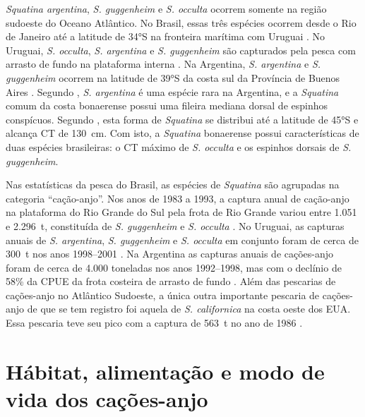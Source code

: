 \documentclass[a4paper,11pt,twoside,showtrims,onecolumn,openright,final]{memoir}
\begin{document}
\emph{Squatina argentina}, \emph{S. guggenheim} e \emph{S. occulta} ocorrem somente na região sudoeste do Oceano Atlântico. 
No Brasil, essas três espécies ocorrem desde o Rio de Janeiro até a latitude de 34°S na fronteira 
marítima com Uruguai \citep{soto2001a}. %
No Uruguai, \emph{S. occulta}, \emph{S. argentina} e \emph{S. guggenheim} são capturados 
pela pesca com arrasto de fundo na plataforma interna \citep{meneses2003,paesch2003}. %
Na Argentina, \emph{S. argentina} e \emph{S. guggenheim} ocorrem na latitude de 39°S 
da costa sul da Província de Buenos Aires \citep{marini1930,marini1936}. %
Segundo \citet{menni1984}, %
\emph{S. argentina} é uma espécie rara na Argentina, e a 
\emph{Squatina} comum da costa bonaerense possui uma fileira mediana dorsal de espinhos conspícuos. 
Segundo \citet{cousseau2000}, %
esta forma de \emph{Squatina} se distribui até a latitude 
de 45°S e alcança CT de 130~cm. Com isto, a \emph{Squatina} bonaerense possui características de duas 
espécies brasileiras: o CT máximo de \emph{S. occulta} e os espinhos dorsais de \emph{S. guggenheim}. 

Nas estatísticas da pesca do Brasil, as espécies de \emph{Squatina} são agrupadas na categoria ``cação-anjo''.  
Nos anos de 1983 a 1993, a captura anual de cação-anjo na plataforma do Rio Grande do Sul pela frota 
de Rio Grande variou entre 1.051 e 2.296~t, constituída de  \emph{S. guggenheim} e \emph{S. occulta} \citep{miranda2003}. %
No Uruguai, as capturas anuais de \emph{S. argentina}, \emph{S. guggenheim} e \emph{S. occulta} em conjunto
foram de cerca de 300~t nos anos 1998--2001 \citep{paesch2003}. %
Na Argentina as capturas anuais de cações-anjo foram de cerca de 4.000 toneladas nos anos 1992--1998,
mas com o declínio de 58\% da CPUE da frota costeira de arrasto de fundo \citep{massa2003}. %
Além das pescarias de cações-anjo no Atlântico Sudoeste, a única outra importante pescaria de cações-anjo de que 
se tem registro foi aquela de  \emph{S. californica} na costa oeste dos EUA. Essa pescaria teve seu pico com a 
captura de 563~t no ano de 1986 \citep{bonfil1994}. %

\section*{Hábitat, alimentação e modo de vida dos cações-anjo}
\end{document}
